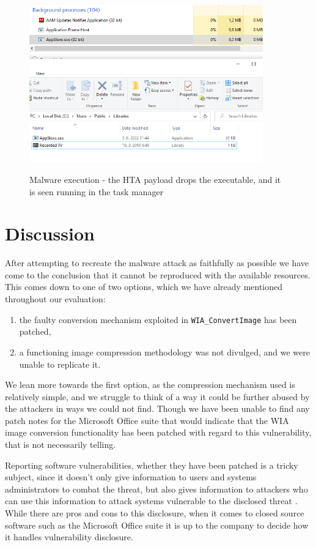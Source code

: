 \begin{figure}[H]
  \centering
  \includegraphics[width=0.9\textwidth]{figures/malware_dropped.png}
  \label{malware-payload-running}
  \caption{Malware execution - the \acrshort{HTA} payload drops the executable, 
  and it is seen running in the task manager}
\end{figure}

\section{Discussion}
After attempting to recreate the malware attack as faithfully as possible we have come to the conclusion that it cannot
be reproduced with the available resources. This comes down to one of two options, which we have already mentioned
throughout our evaluation:
\begin{enumerate}
    \item the faulty conversion mechanism exploited in \verb+WIA_ConvertImage+ has been patched,
    \item a functioning image compression methodology was not divulged, and we were unable to replicate it.
\end{enumerate}

We lean more towards the first option, as the compression mechanism used is relatively simple, and we struggle to
think of a way it could be further abused by the attackers in ways we could not find. Though we have been unable to find
any patch notes for the Microsoft Office suite that would indicate that the \acrfull{WIA} image conversion
functionality has been patched with regard to this vulnerability, that is not necessarily telling.

Reporting software vulnerabilities, whether they have been patched is a tricky subject, since it doesn't only
give information to users and systems administrators to combat the threat, but also gives information to attackers who
can use this information to attack systems vulnerable to the disclosed threat \cite{vuln-disclosure}. While there are
pros and cons to this disclosure, when it comes to closed source software such as the Microsoft Office suite it is up to
the company to decide how it handles vulnerability disclosure. 

